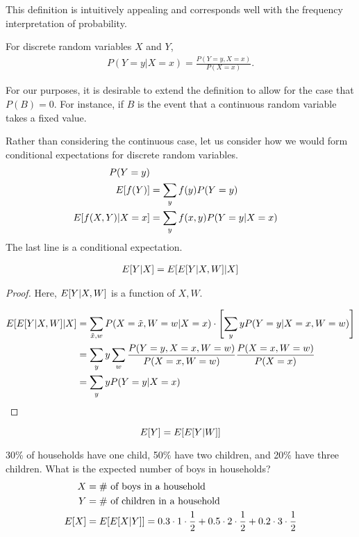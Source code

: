 \documentclass[twoside]{article}
\begin{document}
This definition is intuitively appealing and corresponds well with the
frequency interpretation of probability.

\begin{example}
  For discrete random variables $X$ and $Y$,
  \begin{align*}
    P(Y = y | X = x) = \frac{P(Y = y, X = x)}{P(X = x)}.
  \end{align*}
\end{example}

For our purposes, it is desirable to extend the definition to allow for
the case that $P(B) = 0$.  For instance, if $B$ is the event that a
continuous random variable takes a fixed value.  

Rather than considering the continuous case, let us consider how we
would form conditional expectations for discrete random variables.
\begin{align*}
  P(Y = y) \\
  E[f(Y)] &= \sum_y f(y) P(Y = y) \\
  E[f(X, Y) | X = x] &= \sum_y f(x, y) P(Y = y | X = x)
\end{align*}
The last line is a conditional expectation.

\begin{theorem}
\begin{align*}
  E[Y | X] = E[E[Y | X, W] | X]
\end{align*}
\end{theorem}
\begin{proof}
  Here, $E[Y | X, W]$ is a function of $X, W$. 

  \begin{align*}
    E[E[Y | X, W] | X] &= \sum_{\tilde{x}, w} P(X = \tilde{x}, W = w | X = x)
    \cdot \left[ \sum_y yP(Y = y | X = x, W = w)\right] \\
    &= \sum_y y \sum_w \frac{P(Y = y, X = x, W = w)}{P(X = x, W = w)}  \frac{P(X =
    x, W = w)}{P(X = x)} \\
    &= \sum_y y P(Y = y | X = x)
  \end{align*}
\end{proof}
\begin{corollary}
  \[E[Y] = E[E[Y | W]]\]
\end{corollary}

\begin{example}
30\% of households have one child, 50\% have two children, and 20\% have
three children. What is the expected number of boys in households?
\begin{align*}
  X &= \text{\# of boys in a household} \\
  Y &= \text{\# of children in a household} \\
  E[X] &= E[E[X | Y]]= 0.3 \cdot 1 \cdot \frac{1}{2} + 0.5 \cdot 2 \cdot 
  \frac{1}{2} + 0.2 \cdot 3 \cdot \frac{1}{2}
\end{align*}
\end{example}
\end{document}
